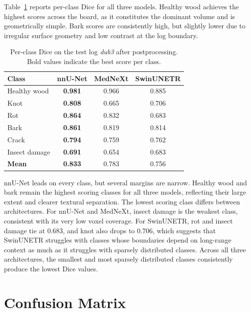 Table~\ref{tab:perclass_results} reports per-class Dice for all three models. Healthy wood achieves the highest scores across the board, as it constitutes the dominant volume and is geometrically simple. Bark scores are consistently high, but slightly lower due to irregular surface geometry and low contrast at the log boundary.

\begin{table}[H]
    \centering
    \caption{Per-class Dice on the test log \textit{dub3} after postprocessing. Bold values indicate the best score per class.}
    \label{tab:perclass_results}
    \begin{tabular}{lccc}
        \toprule
        \textbf{Class} & \textbf{nnU-Net} & \textbf{MedNeXt} & \textbf{SwinUNETR} \\
        \midrule
        Healthy wood  & \textbf{0.981} & 0.966 & 0.885 \\
        Knot          & \textbf{0.808} & 0.665 & 0.706 \\
        Rot           & \textbf{0.864} & 0.832 & 0.683 \\
        Bark          & \textbf{0.861} & 0.819 & 0.814 \\
        Crack         & \textbf{0.794} & 0.759 & 0.762 \\
        Insect damage & \textbf{0.691} & 0.654 & 0.683 \\
        \midrule
        \textbf{Mean} & \textbf{0.833} & 0.783 & 0.756 \\
        \bottomrule
    \end{tabular}
\end{table}

nnU-Net leads on every class, but several margins are narrow. Healthy wood and bark remain the highest scoring classes for all three models, reflecting their large extent and clearer textural separation. The lowest scoring class differs between architectures. For nnU-Net and MedNeXt, insect damage is the weakest class, consistent with its very low voxel coverage. For SwinUNETR, rot and insect damage tie at 0.683, and knot also drops to 0.706, which suggests that SwinUNETR struggles with classes whose boundaries depend on long-range context as much as it struggles with sparsely distributed classes. Across all three architectures, the smallest and most sparsely distributed classes consistently produce the lowest Dice values.

\section{Confusion Matrix}


